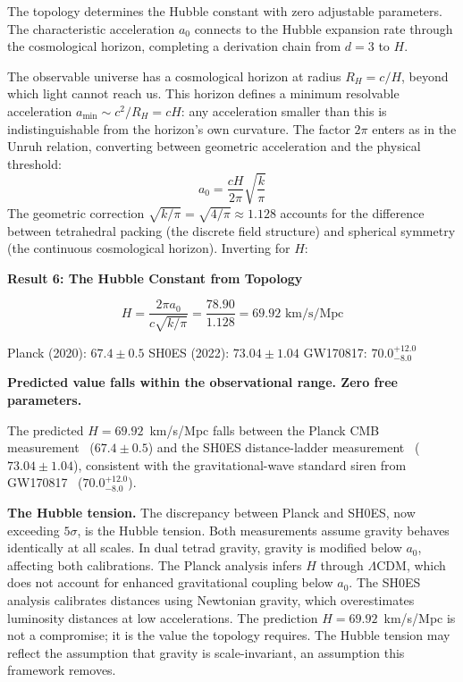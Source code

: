 \documentclass[aps,prd,preprint,superscriptaddress,showpacs,preprintnumbers,amsmath,amssymb,nofootinbib]{revtex4-2}
\begin{document}
The topology determines the Hubble constant with zero adjustable parameters. The characteristic acceleration $a_0$ connects to the Hubble expansion rate through the cosmological horizon, completing a derivation chain from $d = 3$ to $H$.

The observable universe has a cosmological horizon at radius $R_H = c/H$, beyond which light cannot reach us. This horizon defines a minimum resolvable acceleration $a_{\min} \sim c^2/R_H = cH$: any acceleration smaller than this is indistinguishable from the horizon's own curvature. The factor $2\pi$ enters as in the Unruh relation, converting between geometric acceleration and the physical threshold:
\begin{equation}
a_0 = \frac{cH}{2\pi} \sqrt{\frac{k}{\pi}}
\label{eq:cosmo-connect}
\end{equation}
The geometric correction $\sqrt{k/\pi} = \sqrt{4/\pi} \approx 1.128$ accounts for the difference between tetrahedral packing (the discrete field structure) and spherical symmetry (the continuous cosmological horizon). Inverting for $H$:

\vspace{1em}
\noindent
\colorbox{resultgreen}{\parbox{\dimexpr\textwidth-2\fboxsep\relax}{%
\vspace{0.8em}
\centering
\textbf{\large Result 6: The Hubble Constant from Topology}

\vspace{0.5em}
\boldmath
\begin{equation}
H = \frac{2\pi a_0}{c\sqrt{k/\pi}} = \frac{78.90}{1.128} = 69.92 \text{ km/s/Mpc}
\label{eq:hubble-result}
\end{equation}
\unboldmath

\vspace{0.3em}
Planck (2020): $\bm{67.4 \pm 0.5}$ \quad SH0ES (2022): $\bm{73.04 \pm 1.04}$ \quad GW170817: $\bm{70.0^{+12.0}_{-8.0}}$

\textbf{Predicted value falls within the observational range. Zero free parameters.}
\vspace{0.5em}
}}
\vspace{1em}

The predicted $H = 69.92$~km/s/Mpc falls between the Planck CMB measurement~\cite{planck2020} ($67.4 \pm 0.5$) and the SH0ES distance-ladder measurement~\cite{riess2022} ($73.04 \pm 1.04$), consistent with the gravitational-wave standard siren from GW170817~\cite{gw170817} ($70.0^{+12.0}_{-8.0}$).

\textbf{The Hubble tension.} The discrepancy between Planck and SH0ES, now exceeding $5\sigma$, is the Hubble tension. Both measurements assume gravity behaves identically at all scales. In dual tetrad gravity, gravity is modified below $a_0$, affecting both calibrations. The Planck analysis infers $H$ through $\Lambda$CDM, which does not account for enhanced gravitational coupling below $a_0$. The SH0ES analysis calibrates distances using Newtonian gravity, which overestimates luminosity distances at low accelerations. The prediction $H = 69.92$~km/s/Mpc is not a compromise; it is the value the topology requires. The Hubble tension may reflect the assumption that gravity is scale-invariant, an assumption this framework removes.
\end{document}
